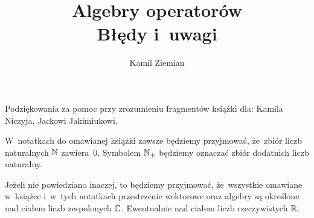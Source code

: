 \documentclass[a4paper,11pt]{article}
\title{Algebry operatorów \\
  {\Large Błędy i~uwagi}}
\author{Kamil Ziemian}
\begin{document}





\maketitle %






\vspace{0em}



Podziękowania za pomoc przy zrozumieniu fragmentów książki dla: Kamila
Niczyja, Jackowi Jakimiukowi.




\vspace{0em}


W~notatkach do omawianej książki zawsze będziemy przyjmować, że~zbiór liczb
naturalnych $\mathbb{N}$ zawiera~$0$. Symbolem $\mathbb{N}_{ + }$ będziemy oznaczać
zbiór dodatnich liczb naturalny.

\vspace{\VerSpaceFour}





Jeżeli nie powiedziano inaczej, to będziemy przyjmować, że~wszystkie
omawiane w~książce i~w~tych notatkach przestrzenie wektorowe oraz algebry są
określone nad ciałem liczb zespolonych $\mathbb{C}$. Ewentualnie nad ciałem
liczb rzeczywistych $\mathbb{R}$.

\vspace{\VerSpaceFour}







\end{document}
